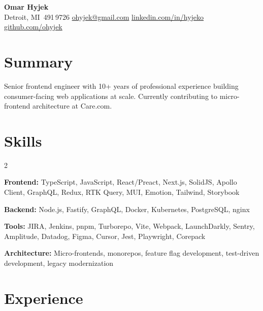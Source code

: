 \documentclass[10pt,letterpaper]{article}
\begin{document}
\begin{center}
  {\Large\bfseries Omar Hyjek} \\[2pt]
  {\footnotesize\color{light}
    \enspace Detroit, MI \enspace\textbar\enspace
    \,491\,9726 \enspace\textbar\enspace
    \enspace \href{mailto:ohyjek@gmail.com}{ohyjek@gmail.com} \enspace\textbar\enspace
    \faLinkedin\enspace \href{https://www.linkedin.com/in/hyjeko}{linkedin.com/in/hyjeko} \enspace\textbar\enspace
    \faGithub\enspace \href{https://github.com/ohyjek}{github.com/ohyjek}
  }
\end{center}

\vspace{-4pt}

\section*{Summary}
{\small Senior frontend engineer with 10+ years of professional experience building consumer-facing web applications at scale. Currently contributing to micro-frontend architecture at Care.com.}

\section*{Skills}
\vspace{-2pt}
\begin{multicols}{2}
{\footnotesize
\textbf{Frontend:} TypeScript, JavaScript, React/Preact, Next.js, SolidJS, Apollo Client, GraphQL, Redux, RTK Query, MUI, Emotion, Tailwind, Storybook

\textbf{Backend:} Node.js, Fastify, GraphQL, Docker, Kubernetes, PostgreSQL, nginx

\columnbreak

\textbf{Tools:} JIRA, Jenkins, pnpm, Turborepo, Vite, Webpack, LaunchDarkly, Sentry, Amplitude, Datadog, Figma, Cursor, Jest, Playwright, Corepack

\textbf{Architecture:} Micro-frontends, monorepos, feature flag development, test-driven development, legacy modernization
}
\end{multicols}

\vspace{-6pt}

\section*{Experience}
\end{document}
